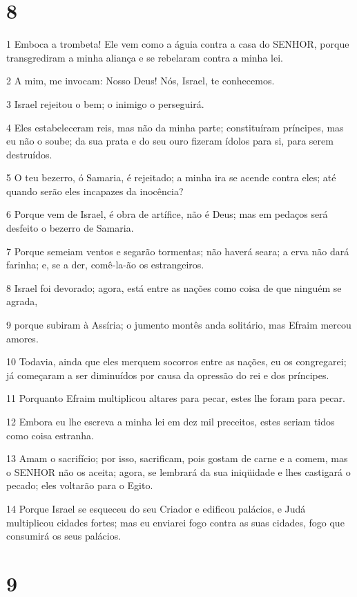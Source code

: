 \chapter{8}

\par 1 Emboca a trombeta! Ele vem como a águia contra a casa do SENHOR, porque transgrediram a minha aliança e se rebelaram contra a minha lei.
\par 2 A mim, me invocam: Nosso Deus! Nós, Israel, te conhecemos.
\par 3 Israel rejeitou o bem; o inimigo o perseguirá.
\par 4 Eles estabeleceram reis, mas não da minha parte; constituíram príncipes, mas eu não o soube; da sua prata e do seu ouro fizeram ídolos para si, para serem destruídos.
\par 5 O teu bezerro, ó Samaria, é rejeitado; a minha ira se acende contra eles; até quando serão eles incapazes da inocência?
\par 6 Porque vem de Israel, é obra de artífice, não é Deus; mas em pedaços será desfeito o bezerro de Samaria.
\par 7 Porque semeiam ventos e segarão tormentas; não haverá seara; a erva não dará farinha; e, se a der, comê-la-ão os estrangeiros.
\par 8 Israel foi devorado; agora, está entre as nações como coisa de que ninguém se agrada,
\par 9 porque subiram à Assíria; o jumento montês anda solitário, mas Efraim mercou amores.
\par 10 Todavia, ainda que eles merquem socorros entre as nações, eu os congregarei; já começaram a ser diminuídos por causa da opressão do rei e dos príncipes.
\par 11 Porquanto Efraim multiplicou altares para pecar, estes lhe foram para pecar.
\par 12 Embora eu lhe escreva a minha lei em dez mil preceitos, estes seriam tidos como coisa estranha.
\par 13 Amam o sacrifício; por isso, sacrificam, pois gostam de carne e a comem, mas o SENHOR não os aceita; agora, se lembrará da sua iniqüidade e lhes castigará o pecado; eles voltarão para o Egito.
\par 14 Porque Israel se esqueceu do seu Criador e edificou palácios, e Judá multiplicou cidades fortes; mas eu enviarei fogo contra as suas cidades, fogo que consumirá os seus palácios.

\chapter{9}

